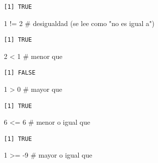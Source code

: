 \documentclass[
  letterpaper,
  DIV=11,
  numbers=noendperiod]{scrreprt}
\newenvironment{Shaded}{\begin{snugshade}}{\end{snugshade}}
\newcommand{\CommentTok}[1]{\textcolor[rgb]{0.37,0.37,0.37}{#1}}
\newcommand{\DecValTok}[1]{\textcolor[rgb]{0.68,0.00,0.00}{#1}}
\newcommand{\SpecialCharTok}[1]{\textcolor[rgb]{0.37,0.37,0.37}{#1}}
\begin{document}
\begin{verbatim}
[1] TRUE
\end{verbatim}

\begin{Shaded}
\begin{Highlighting}[]
\DecValTok{1} \SpecialCharTok{!=} \DecValTok{2}    \CommentTok{\# desigualdad (se lee como "no es igual a")}
\end{Highlighting}
\end{Shaded}

\begin{verbatim}
[1] TRUE
\end{verbatim}

\begin{Shaded}
\begin{Highlighting}[]
\DecValTok{2} \SpecialCharTok{\textless{}} \DecValTok{1}     \CommentTok{\# menor que}
\end{Highlighting}
\end{Shaded}

\begin{verbatim}
[1] FALSE
\end{verbatim}

\begin{Shaded}
\begin{Highlighting}[]
\DecValTok{1} \SpecialCharTok{\textgreater{}} \DecValTok{0}     \CommentTok{\# mayor que}
\end{Highlighting}
\end{Shaded}

\begin{verbatim}
[1] TRUE
\end{verbatim}

\begin{Shaded}
\begin{Highlighting}[]
\DecValTok{6} \SpecialCharTok{\textless{}=} \DecValTok{6}    \CommentTok{\# menor o igual que}
\end{Highlighting}
\end{Shaded}

\begin{verbatim}
[1] TRUE
\end{verbatim}

\begin{Shaded}
\begin{Highlighting}[]
\DecValTok{1} \SpecialCharTok{\textgreater{}=} \SpecialCharTok{{-}}\DecValTok{9}   \CommentTok{\# mayor o igual que}
\end{Highlighting}
\end{Shaded}
\end{document}
